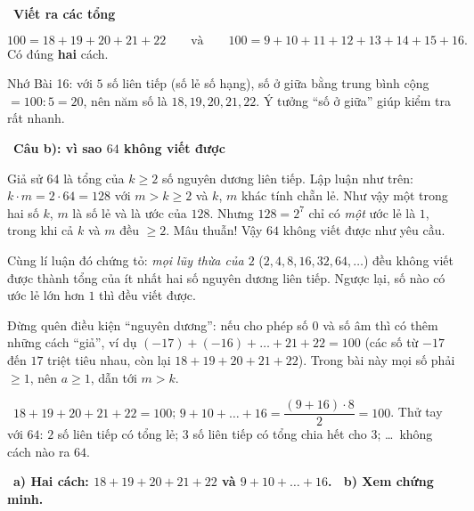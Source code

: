 \documentclass[11pt]{article}
\providecommand{\AnsWord}{Đáp số}
\newcommand{\ans}[1]{\par\smallskip{\bfseries\color{tmGreen!88!black}\AnsWord:}\ {\bfseries\color{AnsRed}#1}\par}
\newcommand{\step}[2]{\par\smallskip\noindent{\bfseries\color{tmBlue!85!black}\StepWord~#1.}\ {\bfseries #2}\par\nopagebreak}
\newcommand{\verify}[1]{\par\smallskip\noindent{\bfseries\color{tmGreen!80!black}\faCheckCircle\ \CheckWord}\ #1\par}
\def\AnsWord{Đáp số}
\def\StepWord{Bước}
\def\CheckWord{Thử lại:}
\begin{document}
{\step{4}{Viết ra các tổng}
\[100=18+19+20+21+22\qquad\text{và}\qquad 100=9+10+11+12+13+14+15+16.\]
Có đúng \textbf{hai} cách.

\begin{tipbox}Nhớ Bài 16: với $5$ số liên tiếp (số lẻ số hạng), số ở giữa bằng trung bình cộng $=100:5=20$, nên năm số là $18,19,20,21,22$. Ý tưởng ``số ở giữa'' giúp kiểm tra rất nhanh.\end{tipbox}

\step{5}{Câu b): vì sao $64$ không viết được}
Giả sử $64$ là tổng của $k\ge 2$ số nguyên dương liên tiếp. Lập luận như trên: $k\cdot m=2\cdot 64=128$ với $m>k\ge 2$ và $k$, $m$ khác tính chẵn lẻ. Như vậy một trong hai số $k$, $m$ là số lẻ và là ước của $128$. Nhưng $128=2^7$ chỉ có \emph{một} ước lẻ là $1$, trong khi cả $k$ và $m$ đều $\ge 2$. Mâu thuẫn! Vậy $64$ không viết được như yêu cầu.

\begin{proofbox}Cùng lí luận đó chứng tỏ: \emph{mọi lũy thừa của $2$} ($2,4,8,16,32,64,\dots$) đều không viết được thành tổng của ít nhất hai số nguyên dương liên tiếp. Ngược lại, số nào có ước lẻ lớn hơn $1$ thì đều viết được.\end{proofbox}

\begin{warnbox}Đừng quên điều kiện ``nguyên dương'': nếu cho phép số $0$ và số âm thì có thêm những cách ``giả'', ví dụ $(-17)+(-16)+\dots+21+22=100$ (các số từ $-17$ đến $17$ triệt tiêu nhau, còn lại $18+19+20+21+22$). Trong bài này mọi số phải $\ge 1$, nên $a\ge 1$, dẫn tới $m>k$.\end{warnbox}

\verify{$18+19+20+21+22=100$; $9+10+\dots+16=\dfrac{(9+16)\cdot 8}{2}=100$. Thử tay với $64$: $2$ số liên tiếp có tổng lẻ; $3$ số liên tiếp có tổng chia hết cho $3$; \dots\ không cách nào ra $64$.}
\ans{a) Hai cách: $18+19+20+21+22$ và $9+10+\dots+16$. \ b) Xem chứng minh.}
}
\end{document}

